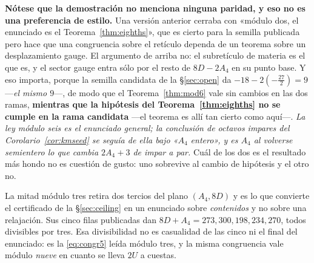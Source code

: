 \documentclass[11pt,a4paper]{article}
\begin{document}
\noindent \textbf{Nótese que la demostración no menciona ninguna paridad, y eso no es una
preferencia de estilo.} Una versión anterior cerraba con «módulo dos, el enunciado es el
Teorema~\ref{thm:eighths}», que es cierto para la semilla publicada pero hace que una congruencia
sobre el retículo dependa de un teorema sobre un desplazamiento gauge. El argumento de arriba no: el
subretículo de materia es el que es, y el sector gauge entra sólo por el resto de $8D-2A_4$ en su
punto base. Y eso importa, porque la semilla candidata de la \S\ref{sec:open} da
$-18-2(-\tfrac{27}{2})=9$ ---\emph{el mismo $9$}---, de modo que el Teorema~\ref{thm:mod6} vale sin
cambios en las dos ramas, \textbf{mientras que la hipótesis del Teorema~\ref{thm:eighths} no se
cumple en la rama candidata} ---el teorema es allí tan cierto como aquí---. \emph{La ley módulo
seis es el enunciado general; la conclusión de octavos impares del Corolario~\ref{cor:kmseed} se
seguía de ella bajo «$A_4$ entero», y es $A_4$ al
volverse semientero lo que cambia $2A_4+3$ de impar a par.} Cuál de los dos es el resultado más
hondo no es cuestión de gusto: uno sobrevive al cambio de hipótesis y el otro no.

\noindent La mitad
módulo tres retira dos tercios del plano $(A_4,8D)$ y es lo que convierte el certificado de la
\S\ref{sec:ceiling} en un enunciado sobre \emph{contenidos} y no sobre una relajación. Sus cinco
filas publicadas dan $8D+A_4=273,300,198,234,270$, todos divisibles por tres. Esa divisibilidad no
es casualidad de las cinco ni el final del enunciado: es la \eqref{eq:congr5} leída módulo tres, y
la misma congruencia vale módulo \emph{nueve} en cuanto se lleva $2U$ a cuestas.
\end{document}
